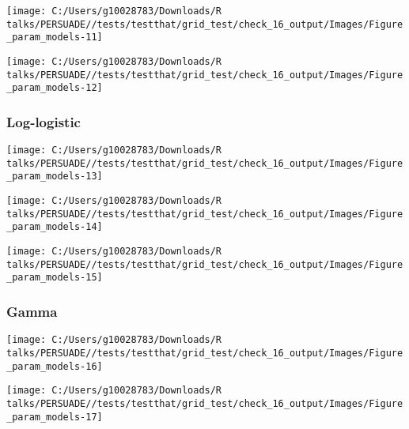 \documentclass[
]{article}
\begin{document}
\begin{flushleft}\texttt{[image: C:/Users/g10028783/Downloads/R talks/PERSUADE//tests/testthat/grid\_test/check\_16\_output/Images/Figure\_param\_models-11]} \end{flushleft}

\begin{flushleft}\texttt{[image: C:/Users/g10028783/Downloads/R talks/PERSUADE//tests/testthat/grid\_test/check\_16\_output/Images/Figure\_param\_models-12]} \end{flushleft}

\clearpage

\subsubsection{Log-logistic}\label{log-logistic}

\begin{flushleft}\texttt{[image: C:/Users/g10028783/Downloads/R talks/PERSUADE//tests/testthat/grid\_test/check\_16\_output/Images/Figure\_param\_models-13]} \end{flushleft}

\begin{flushleft}\texttt{[image: C:/Users/g10028783/Downloads/R talks/PERSUADE//tests/testthat/grid\_test/check\_16\_output/Images/Figure\_param\_models-14]} \end{flushleft}

\begin{flushleft}\texttt{[image: C:/Users/g10028783/Downloads/R talks/PERSUADE//tests/testthat/grid\_test/check\_16\_output/Images/Figure\_param\_models-15]} \end{flushleft}

\clearpage

\subsubsection{Gamma}\label{gamma}

\begin{flushleft}\texttt{[image: C:/Users/g10028783/Downloads/R talks/PERSUADE//tests/testthat/grid\_test/check\_16\_output/Images/Figure\_param\_models-16]} \end{flushleft}

\begin{flushleft}\texttt{[image: C:/Users/g10028783/Downloads/R talks/PERSUADE//tests/testthat/grid\_test/check\_16\_output/Images/Figure\_param\_models-17]} \end{flushleft}
\end{document}
